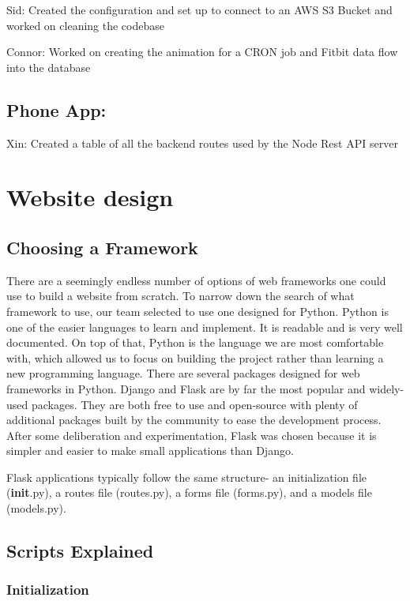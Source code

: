 \documentclass[]{book}
\begin{document}
Sid: Created the configuration and set up to connect to an AWS S3 Bucket
and worked on cleaning the codebase

Connor: Worked on creating the animation for a CRON job and Fitbit data
flow into the database

\subsection{Phone App:}\label{phone-app-1}

Xin: Created a table of all the backend routes used by the Node Rest API
server

\section{Website design}\label{website-design}

\subsection{Choosing a Framework}\label{choosing-a-framework}

There are a seemingly endless number of options of web frameworks one
could use to build a website from scratch. To narrow down the search of
what framework to use, our team selected to use one designed for Python.
Python is one of the easier languages to learn and implement. It is
readable and is very well documented. On top of that, Python is the
language we are most comfortable with, which allowed us to focus on
building the project rather than learning a new programming language.
There are several packages designed for web frameworks in Python. Django
and Flask are by far the most popular and widely-used packages. They are
both free to use and open-source with plenty of additional packages
built by the community to ease the development process. After some
deliberation and experimentation, Flask was chosen because it is simpler
and easier to make small applications than Django.

Flask applications typically follow the same structure- an
initialization file (\textbf{init}.py), a routes file (routes.py), a
forms file (forms.py), and a models file (models.py).

\subsection{Scripts Explained}\label{scripts-explained}

\subsubsection{Initialization}\label{initialization}
\end{document}
